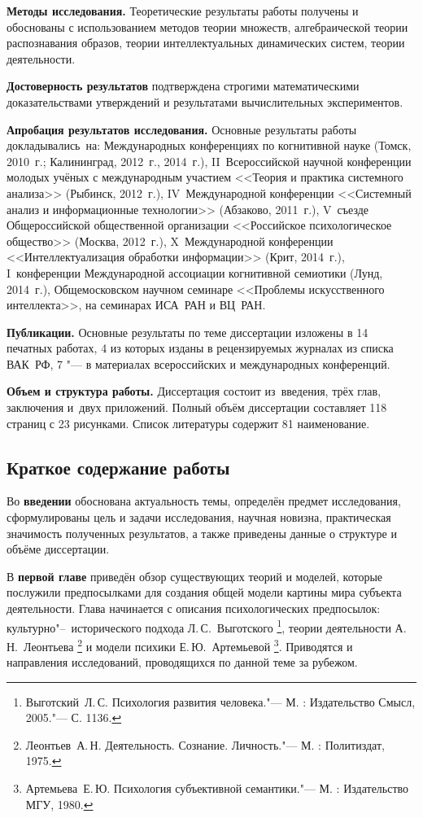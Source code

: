 \textbf{Методы исследования.} Теоретические результаты работы получены и обоснованы с использованием методов теории множеств, алгебраической теории распознавания образов, теории интеллектуальных динамических систем, теории деятельности.

\textbf{Достоверность результатов} подтверждена строгими математическими доказательствами утверждений и результатами вычислительных экспериментов.

\textbf{Апробация результатов исследования.} Основные результаты работы докладывались~на: Международных конференциях по когнитивной науке (Томск, 2010~г.; Калининград, 2012~г., 2014~г.), II~Всероссийской научной конференции молодых учёных с международным участием <<Теория и практика системного анализа>> (Рыбинск, 2012~г.), IV~Международной конференции <<Системный анализ и информационные технологии>> (Абзаково, 2011~г.), V~съезде Общероссийской общественной организации <<Российское психологическое общество>> (Москва, 2012~г.), X~Международной конференции <<Интеллектуализация обработки информации>> (Крит, 2014~г.), I~конференции Международной ассоциации когнитивной семиотики (Лунд, 2014~г.), Общемосковском научном семинаре <<Проблемы искусственного интеллекта>>, на семинарах ИСА~РАН и ВЦ~РАН.

\textbf{Публикации.} Основные результаты по теме диссертации изложены в 14 печатных работах, 4 из которых изданы в рецензируемых журналах из списка ВАК~РФ, 7 "--- в материалах всероссийских и международных конференций.

\textbf{Объем и структура работы.} Диссертация состоит из~введения, трёх глав, заключения и~двух приложений. Полный объём диссертации составляет 118 страниц с 23 рисунками. Список литературы содержит 81 наименование.

\newpage
\subsection*{\Large Краткое содержание работы}
Во \textbf{введении} обоснована актуальность темы, определён предмет исследования, сформулированы цель и задачи исследования, научная новизна, практическая значимость полученных результатов, а также приведены данные о структуре и объёме диссертации.

В \textbf{первой главе} приведён обзор существующих теорий и моделей, которые послужили предпосылками для создания общей модели картины мира субъекта деятельности. Глава начинается с описания психологических предпосылок: культурно"--~исторического подхода Л.\,С.~Выготского \footnote{Выготский~Л.\,С. Психология развития человека."--- М. : Издательство Смысл, 2005."---	С. 1136.}, теории деятельности А.\,Н.~Леонтьева \footnote{Леонтьев~А.\,Н. Деятельность. Сознание. Личность."--- М. : Политиздат, 1975.} и модели психики Е.\,Ю.~Артемьевой \footnote{Артемьева~Е.\,Ю. Психология субъективной семантики."--- М. : Издательство МГУ, 1980.}. Приводятся и направления исследований, проводящихся по данной теме за рубежом.

